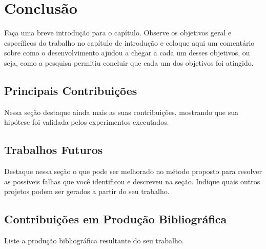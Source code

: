 \chapter[Conclusão]{Conclusão}
Faça uma breve introdução para o capítulo. Observe os objetivos geral e específicos do trabalho no capítulo de introdução e coloque aqui um comentário sobre como o desenvolvimento ajudou a chegar a cada um desses objetivos, ou seja, como a pesquisa permitiu concluir que cada um dos objetivos foi atingido.

\section{Principais Contribuições}
Nessa seção destaque ainda mais as suas contribuições, mostrando que sua hipótese foi validada pelos experimentos executados. 

\section{Trabalhos Futuros}
Destaque nessa seção o que pode ser melhorado no método proposto para resolver as possíveis falhas que você identificou e descreveu na seção. Indique quais outros projetos podem ser gerados a partir do seu trabalho.

\section{Contribuições em Produção Bibliográfica}
Liste a produção bibliográfica resultante do seu trabalho.